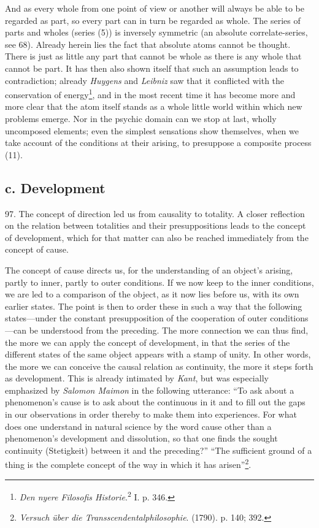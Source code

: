 \documentclass[12pt,a4paper]{book}
\newcommand{\opage}[1]{\marginnote{\footnotesize\textit{[#1]}}}
\begin{document}
\opage{227}And as every whole from one point of view or another will always be able to be
regarded as part, so every part can in turn be regarded as whole. The series
of parts and wholes (series (5)) is inversely symmetric (an absolute
correlate-series, see 68). Already herein lies the fact that absolute atoms
cannot be thought. There is just as little any part that cannot be whole as
there is any whole that cannot be part. It has then also shown itself that such
an assumption leads to contradiction; already \emph{Huygens} and \emph{Leibniz}
saw that it conflicted with the conservation of energy\footnote{\emph{Den nyere
Filosofis Historie}.\textsuperscript{2} I. p. 346.}, and in the most recent
time it has become more and more clear that the atom itself stands as a whole
little world within which new problems emerge. Nor in the psychic domain can we
stop at last, wholly uncomposed elements; even the simplest sensations show
themselves, when we take account of the conditions at their arising, to
presuppose a composite process (11).

\subsection*{c. Development}

97. The concept of direction led us from causality to totality. A closer
reflection on the relation between totalities and their presuppositions leads
to the concept of development, which for that matter can also be reached
immediately from the concept of cause.

The concept of cause directs us, for the understanding of an object's
arising, partly to inner, partly to outer conditions. If we now keep to the
inner conditions, we are led to a comparison of the object, as it now lies
before us, with its own earlier states. The point is then to order these in
such a way that the following states---under the constant presupposition of
the cooperation of outer conditions---can be understood from the preceding.
The more connection we can thus find, the more we can apply the concept of
development, in that the series of the different states of the same object
appears with a stamp of unity. In other words, the more we can conceive the
causal relation as continuity, the more it steps forth as development. \opage{228}This
is already intimated by \emph{Kant}, but was especially emphasized by
\emph{Salomon Maimon} in the following utterance: ``To ask about a
phenomenon's cause is to ask about the continuous in it and to fill out the
gaps in our observations in order thereby to make them into experiences. For
what does one understand in natural science by the word cause other than a
phenomenon's development and dissolution, so that one finds the sought
continuity (Stetigkeit) between it and the preceding?'' ``The sufficient
ground of a thing is the complete concept of the way in which it has
arisen''\footnote{\emph{Versuch über die Transscendentalphilosophie}. (1790).
p. 140; 392.}.
\end{document}
